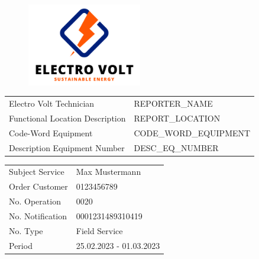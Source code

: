 \documentclass[openany, 10pt]{article}
\begin{document}
    \vspace{-1cm}

    \begin{center}
        \begin{figure}[H]
            \centering
            \includegraphics[width=5cm]{resource/logo.png}
        \end{figure}
    \end{center}
    
    \vspace{-1cm}
    
    \begin{flushright}
        \begin{small}
            \begin{tabular}{l l}
                Electro Volt Technician & {{ REPORTER\_NAME }} \\
                Functional Location Description & {{ REPORT\_LOCATION }} \\
                Code-Word Equipment & {{ CODE\_WORD\_EQUIPMENT }} \\
                Description Equipment Number & {{ DESC\_EQ\_NUMBER }}
            \end{tabular}
        \end{small}
    \end{flushright}

    \begin{tcolorbox}[colback=white,boxrule=0.5pt,sharp corners]
        \begin{minipage}[H]{\linewidth}
            \begin{large}
                \begin{tabular}{l l}
                    Subject Service & Max Mustermann \\
                    Order Customer & 0123456789 \\
                    No. Operation & 0020 \\
                    No. Notification & 0001231489310419 \\
                    No. Type & Field Service \\
                    Period & 25.02.2023 - 01.03.2023 \\
                \end{tabular}
            \end{large}
        \end{minipage}
    \end{tcolorbox}
\end{document}
